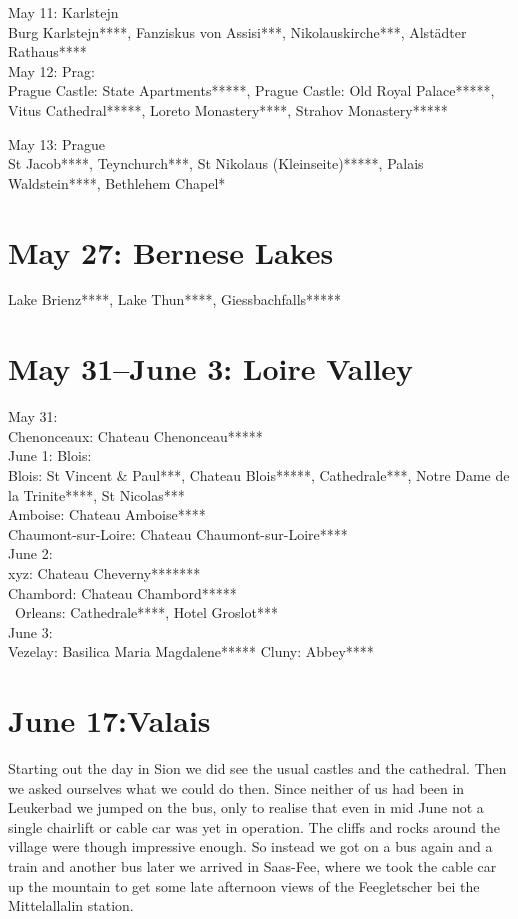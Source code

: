 May 11: Karlstejn\\
Burg Karlstejn****, Fanziskus von Assisi***, Nikolauskirche***, Alst\"adter Rathaus****\\

May 12: Prag:\\
Prague Castle: State Apartments*****, Prague Castle: Old Royal Palace*****, Vitus Cathedral*****, Loreto Monastery****, Strahov Monastery*****

May 13: Prague\\
St Jacob****, Teynchurch***, St Nikolaus (Kleinseite)*****, Palais Waldstein****, Bethlehem Chapel*

\section{May 27: Bernese Lakes}
\label{Brienz2012}

Lake Brienz****, Lake Thun****, Giessbachfalls*****

\section{May 31--June 3: Loire Valley}
\label{2012Loire}

May 31:\\
Chenonceaux: Chateau Chenonceau*****\\

June 1: Blois:\\
Blois: St Vincent \& Paul***, Chateau Blois*****, Cathedrale***, Notre Dame de la Trinite****, St Nicolas***\\
Amboise: Chateau Amboise****\\
Chaumont-sur-Loire: Chateau Chaumont-sur-Loire****\\

June 2:\\
xyz: Chateau Cheverny*******\\
Chambord: Chateau Chambord*****\\\
Orleans: Cathedrale****, Hotel Groslot***\\

June 3:\\
Vezelay: Basilica Maria Magdalene*****
Cluny: Abbey****

\section{June 17:Valais}
\label{Valais2012}

Starting out the day in Sion we did see the usual castles and the cathedral. Then we asked ourselves what we could do then. Since neither of us had been in Leukerbad we jumped on the bus, only to realise that even in mid June not a single chairlift or cable car was yet in operation. The cliffs and rocks around the village were though impressive enough. So instead we got on a bus again and a train and another bus later we arrived in Saas-Fee, where we took the cable car up the mountain to get some late afternoon views of the Feegletscher bei the Mittelallalin station.\\

